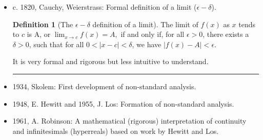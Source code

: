 \documentclass[portrait]{tikzposter}
\newcommand{\itemrule}{\vspace{0.5cm}\hrule\vspace{0.3cm}}
\theoremstyle{definition}
\newtheorem*{definition}{Definition}
\theoremstyle{plain}
\theoremstyle{remark}
\begin{document}
\begin{columns}
{\begin{itemize}
                  \itemrule

            \item c. 1820, Cauchy, Weierstrass: Formal definition of a limit (\(\epsilon-\delta\)).

                  \begin{definition}[The \(\epsilon-\delta\) definition of a limit]
                      The limit of \(f(x)\) as \(x\) tends to \(c\) is A, or \( \lim_{x \rightarrow c} f(x) = A,\) if and only if, for all \(\epsilon > 0\), there exists a \(\delta > 0\), such that for all \(0 < |x - c| < \delta\), we have \(|f(x) - A| < \epsilon\).
                  \end{definition}

                  It is very formal and rigorous but less intuitive to understand.

                  \itemrule

            \item 1934, Skolem: First development of non-standard analysis.
            \item 1948, E. Hewitt and 1955, J. Los: Formation of non-standard analysis.
            \item 1961, A. Robinson: A mathematical (rigorous) interpretation of continuity and infinitesimals (hyperreals) based on work by Hewitt and Los.
        \end{itemize}
    }

\end{columns}
\end{document}
